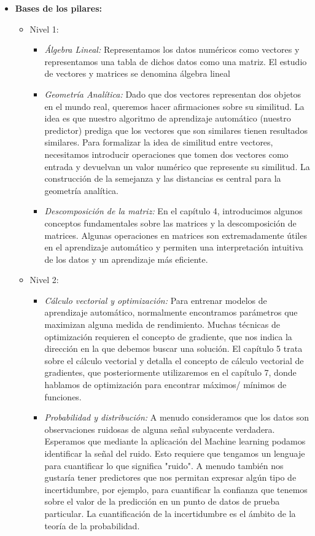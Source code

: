 \documentclass{templateApunte}
\begin{document}
\begin{itemize}
  \item \textbf{Bases de los pilares:}
  \begin{itemize}
    \item Nivel 1:
    \begin{itemize}
      \item \textit{Álgebra Lineal:} Representamos los datos numéricos como vectores y \newline representamos una tabla de dichos datos como una matriz. El estudio de vectores y matrices se denomina álgebra lineal
      \item \textit{Geometría Analítica:} Dado que dos vectores representan dos objetos en el mundo real, queremos hacer afirmaciones sobre su similitud. La idea es que nuestro algoritmo de aprendizaje automático (nuestro predictor) prediga que los vectores que son similares tienen resultados similares. 
      Para formalizar la idea de similitud entre vectores, necesitamos introducir operaciones que tomen dos vectores como entrada y devuelvan un valor numérico que represente su similitud. La construcción de la semejanza y las distancias es central para la geometría analítica.
      \item \textit{Descomposición de la matriz:} En el capítulo 4, introducimos algunos conceptos fundamentales sobre las matrices y la descomposición de matrices. Algunas operaciones en matrices son extremadamente útiles en el aprendizaje automático y permiten una interpretación intuitiva de los datos y un aprendizaje más eficiente.
    \end{itemize}

    \newpage
    \item Nivel 2:
    \begin{itemize}
      \item \textit{Cálculo vectorial y optimización:} Para entrenar modelos de aprendizaje automático, normalmente encontramos parámetros que maximizan alguna medida de rendimiento. Muchas técnicas de optimización requieren el concepto de gradiente, que nos indica la dirección en la que debemos buscar una solución.
      El capítulo 5 trata sobre el cálculo vectorial y detalla el concepto de cálculo vectorial de gradientes, que posteriormente utilizaremos en el capítulo 7, donde hablamos de optimización para encontrar máximos/ mínimos de funciones.
      \item \textit{Probabilidad y distribución:} A menudo consideramos que los datos son observaciones ruidosas de alguna señal subyacente verdadera. Esperamos que mediante la aplicación del Machine learning podamos identificar la señal del ruido. Esto requiere que tengamos un lenguaje para cuantificar lo que significa "ruido". A menudo también nos gustaría tener predictores que nos permitan expresar algún tipo de incertidumbre, por ejemplo, para cuantificar la confianza que tenemos sobre el valor de la predicción en un punto de datos de prueba particular. La cuantificación de la incertidumbre es el ámbito de la teoría de la probabilidad.
    \end{itemize}
  \end{itemize}
\end{itemize}
\end{document}

